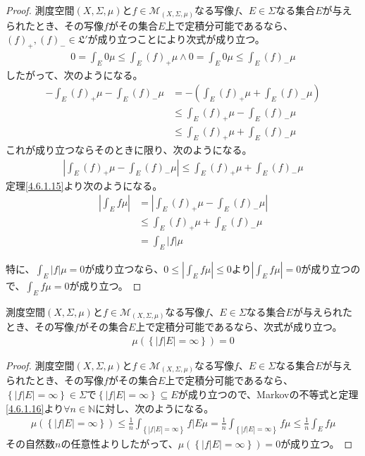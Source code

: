 \documentclass[dvipdfmx]{jsarticle}
\begin{document}
\begin{proof}
測度空間$(X,\varSigma,\mu)$と$f \in \mathcal{M}_{(X,\varSigma,\mu)}$なる写像$f$、$E \in \varSigma$なる集合$E$が与えられたとき、その写像$f$がその集合$E$上で定積分可能であるなら、$(f)_{+},(f)_{-} \in \mathfrak{L}'$が成り立つことにより次式が成り立つ。
\begin{align*}
0 = \int_{E} {0\mu} \leq \int_{E} {(f)_{+}\mu} \land 0 = \int_{E} {0\mu} \leq \int_{E} {(f)_{-}\mu}
\end{align*}
したがって、次のようになる。
\begin{align*}
- \int_{E} {(f)_{+}\mu} - \int_{E} {(f)_{-}\mu} &= - \left( \int_{E} {(f)_{+}\mu} + \int_{E} {(f)_{-}\mu} \right)\\
&\leq \int_{E} {(f)_{+}\mu} - \int_{E} {(f)_{-}\mu}\\
&\leq \int_{E} {(f)_{+}\mu} + \int_{E} {(f)_{-}\mu}
\end{align*}
これが成り立つならそのときに限り、次のようになる。
\begin{align*}
\left| \int_{E} {(f)_{+}\mu} - \int_{E} {(f)_{-}\mu} \right| \leq \int_{E} {(f)_{+}\mu} + \int_{E} {(f)_{-}\mu}
\end{align*}
定理\ref{4.6.1.15}より次のようになる。
\begin{align*}
\left| \int_{E} {f\mu} \right| &= \left| \int_{E} {(f)_{+}\mu} - \int_{E} {(f)_{-}\mu} \right|\\
&\leq \int_{E} {(f)_{+}\mu} + \int_{E} {(f)_{-}\mu}\\
&= \int_{E} {|f|\mu}
\end{align*}\par
特に、$\int_{E} {|f|\mu} = 0$が成り立つなら、$0 \leq \left| \int_{E} {f\mu} \right| \leq 0$より$\left| \int_{E} {f\mu} \right| = 0$が成り立つので、$\int_{E} {f\mu} = 0$が成り立つ。
\end{proof}
\begin{thm}\label{4.6.1.19}
測度空間$(X,\varSigma,\mu)$と$f \in \mathcal{M}_{(X,\varSigma,\mu)}$なる写像$f$、$E \in \varSigma$なる集合$E$が与えられたとき、その写像$f$がその集合$E$上で定積分可能であるなら、次式が成り立つ。
\begin{align*}
\mu\left( \left\{ \left| f|E \right| = \infty \right\} \right) = 0
\end{align*}
\end{thm}
\begin{proof}
測度空間$(X,\varSigma,\mu)$と$f \in \mathcal{M}_{(X,\varSigma,\mu)}$なる写像$f$、$E \in \varSigma$なる集合$E$が与えられたとき、その写像$f$がその集合$E$上で定積分可能であるなら、$\left\{ \left| f|E \right| = \infty \right\} \in \varSigma$で$\left\{ \left| f|E \right| = \infty \right\} \subseteq E$が成り立つので、Markovの不等式と定理\ref{4.6.1.16}より$\forall n \in \mathbb{N}$に対し、次のようになる。
\begin{align*}
\mu\left( \left\{ \left| f|E \right| = \infty \right\} \right) \leq \frac{1}{n}\int_{\left\{ \left| f|E \right| = \infty \right\}} {f|E\mu} = \frac{1}{n}\int_{\left\{ \left| f|E \right| = \infty \right\}} {f\mu} \leq \frac{1}{n}\int_{E} {f\mu}
\end{align*}
その自然数$n$の任意性よりしたがって、$\mu\left( \left\{ \left| f|E \right| = \infty \right\} \right) = 0$が成り立つ。
\end{proof}
\end{document}
